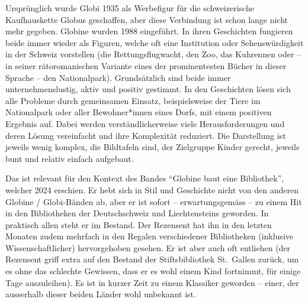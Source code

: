 \documentclass[a4paper,
fontsize=11pt,
oneside,
numbers=noperiodatend,
parskip=half-,
bibliography=totoc,
final
]{scrartcl}
\begin{document}
Ursprünglich wurde Globi 1935 als Werbefigur für die schweizerische
Kaufhauskette Globus geschaffen, aber diese Verbindung ist schon lange
nicht mehr gegeben. Globine wurden 1988 eingeführt. In ihren Geschichten
fungieren beide immer wieder als Figuren, welche oft eine Institution
oder Sehenswürdigkeit in der Schweiz vorstellen (die Rettungsflugwacht,
den Zoo, das Kuhrennen oder -- in seiner rätoromanischen Variante eines
der prominentesten Bücher in dieser Sprache -- den Nationalpark).
Grundsätzlich sind beide immer unternehmenslustig, aktiv und positiv
gestimmt. In den Geschichten lösen sich alle Probleme durch gemeinsamen
Einsatz, beispielsweise der Tiere im Nationalpark oder aller
Bewohner*innen eines Dorfs, mit einem positiven Ergebnis auf. Dabei
werden verständlicherweise viele Herausforderungen und deren Lösung
vereinfacht und ihre Komplexität reduziert. Die Darstellung ist jeweils
wenig komplex, die Bildtafeln sind, der Zielgruppe Kinder gerecht,
jeweils bunt und relativ einfach aufgebaut.

Das ist relevant für den Kontext des Bandes \enquote{Globine baut eine
Bibliothek}, welcher 2024 erschien. Er hebt sich in Stil und Geschichte
nicht von den anderen Globine / Globi-Bänden ab, aber er ist sofort --
erwartungsgemäss -- zu einem Hit in den Bibliotheken der Deutschschweiz
und Liechtensteins geworden. In praktisch allen steht er im Bestand. Der
Rezensent hat ihn in den letzten Monaten zudem mehrfach in den Regalen
verschiedener Bibliotheken (inklusive Wissenschaftlicher) hervorgehoben
gesehen. Er ist aber auch oft entliehen (der Rezensent griff extra auf
den Bestand der Stiftsbibliothek St.~Gallen zurück, um es ohne das
schlechte Gewissen, dass er es wohl einem Kind fortnimmt, für einige
Tage auszuleihen). Es ist in kurzer Zeit zu einem Klassiker geworden --
einer, der ausserhalb dieser beiden Länder wohl unbekannt ist.
\end{document}
